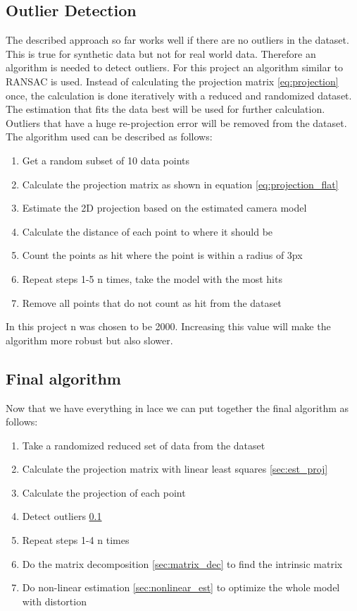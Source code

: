 \documentclass[11pt,a4paper,titlepage,oneside]{report}
\begin{document}
\subsection{Outlier Detection}\label{sec:outliers}
The described approach so far works well if there are no outliers in the dataset. This is true for synthetic data but not for real world data. Therefore an algorithm is needed to detect outliers. For this project an algorithm similar to RANSAC \cite{ransac} is used. Instead of calculating the projection matrix \ref{eq:projection} once, the calculation is done iteratively with a reduced and randomized dataset. The estimation that fits the data best will be used for further calculation. Outliers that have a huge re-projection error will be removed from the dataset. The algorithm used can be described as follows:
\begin{enumerate}
	\item Get a random subset of 10 data points
	\item Calculate the projection matrix as shown in equation \ref{eq:projection_flat}
	\item Estimate the 2D projection based on the estimated camera model
	\item Calculate the distance of each point to where it should be
	\item Count the points as hit where the point is within a radius of 3px
	\item Repeat steps 1-5 n times, take the model with the most hits
	\item Remove all points that do not count as hit from the dataset
\end{enumerate}

In this project n was chosen to be 2000. Increasing this value will make the algorithm more robust but also slower.

\subsection{Final algorithm}
Now that we have everything in lace we can put together the final algorithm as follows:
\begin{enumerate}
	\item Take a randomized reduced set of data from the dataset
	\item Calculate the projection matrix with linear least squares \ref{sec:est_proj}
	\item Calculate the projection of each point
	\item Detect outliers \ref{sec:outliers}
	\item Repeat steps 1-4 n times
	\item Do the matrix decomposition \ref{sec:matrix_dec} to find the intrinsic matrix
	\item Do non-linear estimation \ref{sec:nonlinear_est} to optimize the whole model with distortion
\end{enumerate}
\end{document}
